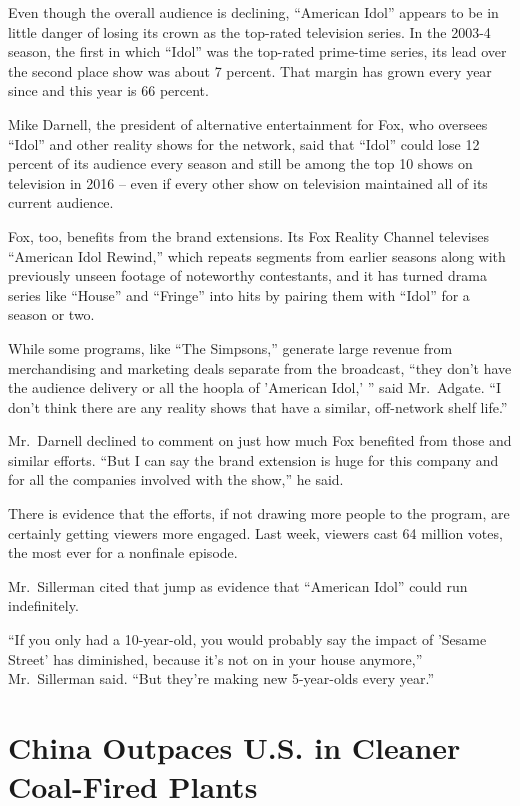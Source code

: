 \documentclass[12pt,a4paper,onecolumn]{article}
\begin{document}
Even though the overall audience is declining, ``American Idol'' appears to be in little danger of
losing its crown as the top-rated television series. In the 2003-4 season, the first in which
``Idol'' was the top-rated prime-time series, its lead over the second place show was about 7
percent. That margin has grown every year since and this year is 66 percent.

Mike Darnell, the president of alternative entertainment for Fox, who oversees ``Idol'' and other
reality shows for the network, said that ``Idol'' could lose 12 percent of its audience every season
and still be among the top 10 shows on television in 2016 -- even if every other show on television
maintained all of its current audience.

Fox, too, benefits from the brand extensions. Its Fox Reality Channel televises ``American Idol
Rewind,'' which repeats segments from earlier seasons along with previously unseen footage of
noteworthy contestants, and it has turned drama series like ``House'' and ``Fringe'' into hits by
pairing them with ``Idol'' for a season or two.

While some programs, like ``The Simpsons,'' generate large revenue from merchandising and marketing
deals separate from the broadcast, ``they don't have the audience delivery or all the hoopla of
'American Idol,' '' said Mr.~Adgate. ``I don't think there are any reality shows that have a
similar, off-network shelf life.''

Mr.~Darnell declined to comment on just how much Fox benefited from those and similar efforts. ``But
I can say the brand extension is huge for this company and for all the companies involved with the
show,'' he said.

There is evidence that the efforts, if not drawing more people to the program, are certainly getting
viewers more engaged. Last week, viewers cast 64 million votes, the most ever for a nonfinale
episode.

Mr.~Sillerman cited that jump as evidence that ``American Idol'' could run indefinitely.

``If you only had a 10-year-old, you would probably say the impact of 'Sesame Street' has
diminished, because it's not on in your house anymore,'' Mr.~Sillerman said. ``But they're making
new 5-year-olds every year.''

\section{China Outpaces U.S. in Cleaner Coal-Fired Plants}
\end{document}
